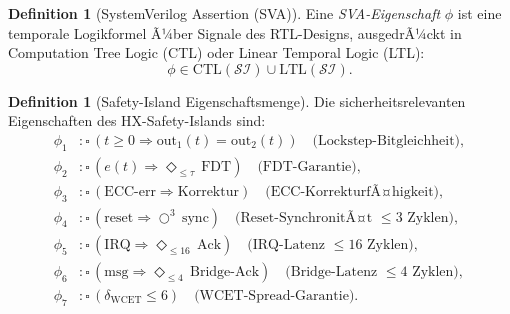 ﻿\documentclass[a4paper,12pt]{article}
\theoremstyle{plain}
\theoremstyle{definition}
\newtheorem{definition}[theorem]{Definition}
\theoremstyle{remark}
\begin{document}
\begin{definition}[SystemVerilog Assertion (SVA)]\label{def:sva}
Eine \emph{SVA-Eigenschaft} $\phi$ ist eine temporale Logikformel
Ã¼ber Signale des RTL-Designs, ausgedrÃ¼ckt in
Computation Tree Logic (CTL) oder Linear Temporal Logic (LTL):
\[
  \phi \in \mathrm{CTL}(\mathcal{SI}) \cup \mathrm{LTL}(\mathcal{SI}).
\]
\end{definition}

\begin{definition}[Safety-Island Eigenschaftsmenge]\label{def:si_props}
Die sicherheitsrelevanten Eigenschaften des HX-Safety-Islands sind:
\begin{align}
  \phi_1 &: \square\,(t \geq 0 \Rightarrow \text{out}_1(t) = \text{out}_2(t))
            \quad\text{(Lockstep-Bitgleichheit)}, \label{eq:phi1}\\
  \phi_2 &: \square\,(e(t) \Rightarrow \Diamond_{\leq\tau}\,\mathrm{FDT})
            \quad\text{(FDT-Garantie)}, \label{eq:phi2}\\
  \phi_3 &: \square\,(\mathrm{ECC\text{-}err} \Rightarrow \mathrm{Korrektur})
            \quad\text{(ECC-KorrekturfÃ¤higkeit)}, \label{eq:phi3}\\
  \phi_4 &: \square\,(\mathrm{reset} \Rightarrow \bigcirc^3\,\mathrm{sync})
            \quad\text{(Reset-SynchronitÃ¤t $\leq 3$ Zyklen)}, \label{eq:phi4}\\
  \phi_5 &: \square\,(\mathrm{IRQ} \Rightarrow \Diamond_{\leq 16}\,\mathrm{Ack})
            \quad\text{(IRQ-Latenz $\leq 16$ Zyklen)}, \label{eq:phi5}\\
  \phi_6 &: \square\,(\mathrm{msg} \Rightarrow \Diamond_{\leq 4}\,\mathrm{Bridge\text{-}Ack})
            \quad\text{(Bridge-Latenz $\leq 4$ Zyklen)}, \label{eq:phi6}\\
  \phi_7 &: \square\,(\delta_\mathrm{WCET} \leq 6)
            \quad\text{(WCET-Spread-Garantie)}. \label{eq:phi7}
\end{align}
\end{definition}
\end{document}
